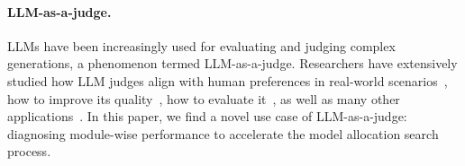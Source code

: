 \paragraph{LLM-as-a-judge.} LLMs have been increasingly used for evaluating and judging complex generations, a phenomenon termed LLM-as-a-judge. Researchers have extensively studied how LLM judges align with human preferences in real-world scenarios~\cite{zheng2023judging,shankar2024validates}, how to improve its quality~\cite{kim2023prometheus}, how to evaluate it~\cite{chiang2024chatbot,chen2024mllm,zeng2023evaluating}, as well as many other applications~\cite{johri2025evaluation,dhole2024conqret,gu2024survey,zhou2024llm}. In this paper, we find a novel use case of LLM-as-a-judge: diagnosing module-wise performance to accelerate the model allocation search process.